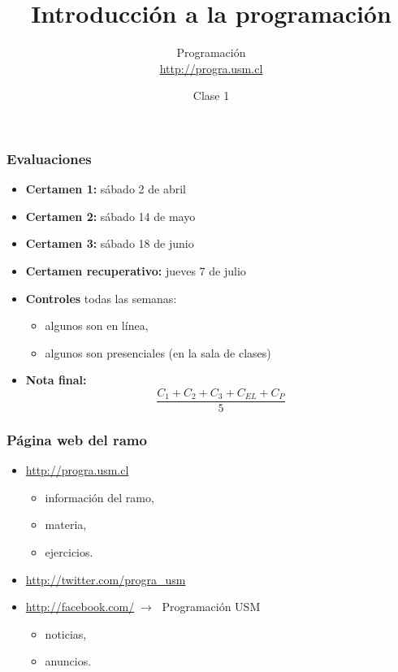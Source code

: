 \documentclass[12pt]{beamer}
\title{Introducción a la programación}
\author{Programación \\ \url{http://progra.usm.cl}}
\date{Clase 1}
\begin{document}
  \begin{frame}
    \maketitle
  \end{frame}

  \begin{frame}
    \frametitle{Evaluaciones}
    \label{evaluaciones}
    \begin{itemize}
      \item \textbf{Certamen 1:} sábado  2 de abril
      \item \textbf{Certamen 2:} sábado 14 de mayo
      \item \textbf{Certamen 3:} sábado 18 de junio
      \item \textbf{Certamen recuperativo:} jueves 7 de julio
      \vfill
      \item \textbf{Controles} \alert{todas las semanas}:
      \begin{itemize}
        \item algunos son en línea,
        \item algunos son presenciales (en la sala de clases)
      \end{itemize}
      \vfill
      \item \textbf{Nota final:}
        \[ \frac{C_1 + C_2 + C_3 + C_{EL} + C_P}{5} \]
    \end{itemize}
  \end{frame}

  \begin{frame}
    \frametitle{Página web del ramo}
    \label{web}
    \begin{itemize}
      \item \url{http://progra.usm.cl}
        \begin{itemize}
          \item información del ramo,
          \item materia,
          \item ejercicios.
        \end{itemize}
      \vfill
      \item \url{http://twitter.com/progra_usm}
      \item \url{http://facebook.com/}\(\;\rightarrow\;\) Programación USM
        \begin{itemize}
          \item noticias,
          \item anuncios.
        \end{itemize}
    \end{itemize}
  \end{frame}
\end{document}
